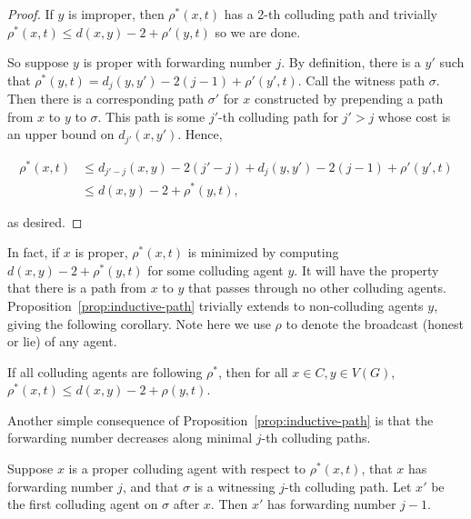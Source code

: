 \documentclass[prodmode,acmec]{ec-acmsmall}
\begin{document}
\begin{proof}

If $y$ is improper, then $\rho^*(x,t)$ has a 2-th colluding path and trivially
$\rho^*(x,t) \leq d(x,y) - 2 + \rho'(y,t)$ so we are done.

So suppose $y$ is proper with forwarding number $j$. By definition, there is a
$y'$ such that $\rho^*(y,t) = d_j(y,y') - 2(j-1) + \rho'(y',t)$. Call the
witness path $\sigma$. Then there is a corresponding path $\sigma'$ for $x$
constructed by prepending a path from $x$ to $y$ to $\sigma$. This path is some
$j'$-th colluding path for $j' > j$ whose cost is an upper bound on
$d_{j'}(x,y')$.  Hence,

\begin{align*}
   \rho^*(x,t) &\leq d_{j'-j}(x,y) - 2(j' - j) + d_j(y,y') - 2(j-1) +
\rho'(y',t) \\
               &\leq d(x,y) - 2 + \rho^*(y,t),
\end{align*}

as desired.
\end{proof}

In fact, if $x$ is proper, $\rho^*(x,t)$ is minimized by computing $d(x,y) - 2
+ \rho^*(y,t)$ for some colluding agent $y$. It will have the property that
there is a path from $x$ to $y$ that passes through no other colluding agents.
Proposition~\ref{prop:inductive-path} trivially extends to non-colluding agents
$y$, giving the following corollary. Note here we use $\rho$ to denote the
broadcast (honest or lie) of any agent.

\begin{corollary} \label{cor:rhostar-bound}

If all colluding agents are following $\rho^*$, then for all $x \in C, y \in
V(G)$, $\rho^*(x,t) \leq d(x,y) - 2 + \rho(y,t)$.

\end{corollary}

Another simple consequence of Proposition~\ref{prop:inductive-path} is that the
forwarding number decreases along minimal $j$-th colluding paths.

\begin{proposition} \label{prop:inductive-forwarding-number}

Suppose $x$ is a proper colluding agent with respect to $\rho^*(x,t)$, that $x$
has forwarding number $j$, and that $\sigma$ is a witnessing $j$-th colluding
path. Let $x'$ be the first colluding agent on $\sigma$ after $x$. Then $x'$
has forwarding number $j-1$.  

\end{proposition}
\end{document}
